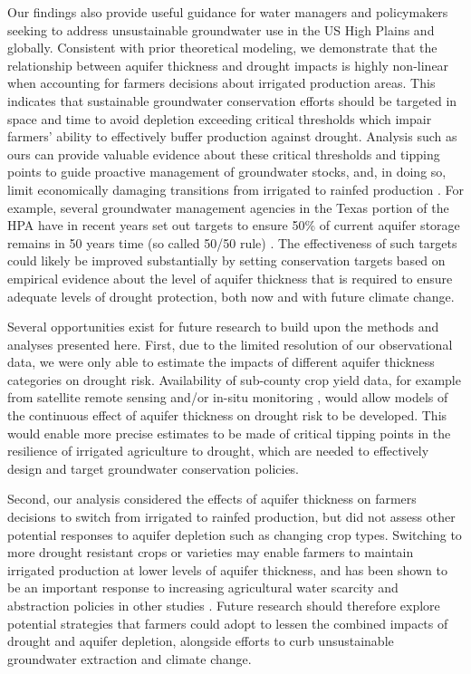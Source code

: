 \documentclass[
]{article}
\begin{document}
Our findings also provide useful guidance for water managers and policymakers seeking to address unsustainable groundwater use in the US High Plains and globally. Consistent with prior theoretical modeling, we demonstrate that the relationship between aquifer thickness and drought impacts is highly non-linear when accounting for farmers decisions about irrigated production areas. This indicates that sustainable groundwater conservation efforts \citep{macewan2017hydroecon, butler2020charting, elshall2020groundwater} should be targeted in space and time to avoid depletion exceeding critical thresholds which impair farmers' ability to effectively buffer production against drought. Analysis such as ours can provide valuable evidence about these critical thresholds and tipping points to guide proactive management of groundwater stocks, and, in doing so, limit economically damaging transitions from irrigated to rainfed production \citep{foster2017effects, deines2020transitions}. For example, several groundwater management agencies in the Texas portion of the HPA have in recent years set out targets to ensure 50\% of current aquifer storage remains in 50 years time (so called 50/50 rule) \citep{closas2018chronicle}. The effectiveness of such targets could likely be improved substantially by setting conservation targets based on empirical evidence about the level of aquifer thickness that is required to ensure adequate levels of drought protection, both now and with future climate change.

Several opportunities exist for future research to build upon the methods and analyses presented here. First, due to the limited resolution of our observational data, we were only able to estimate the impacts of different aquifer thickness categories on drought risk. Availability of sub-county crop yield data, for example from satellite remote sensing and/or in-situ monitoring \citep{edreira2020combining, deines2021million}, would allow models of the continuous effect of aquifer thickness on drought risk to be developed. This would enable more precise estimates to be made of critical tipping points in the resilience of irrigated agriculture to drought, which are needed to effectively design and target groundwater conservation policies.

Second, our analysis considered the effects of aquifer thickness on farmers decisions to switch from irrigated to rainfed production, but did not assess other potential responses to aquifer depletion such as changing crop types. Switching to more drought resistant crops or varieties may enable farmers to maintain irrigated production at lower levels of aquifer thickness, and has been shown to be an important response to increasing agricultural water scarcity and abstraction policies in other studies \citep{bhattarai2021impact, deines2019quantifying, manning2017producer}. Future research should therefore explore potential strategies that farmers could adopt to lessen the combined impacts of drought and aquifer depletion, alongside efforts to curb unsustainable groundwater extraction and climate change.
\end{document}
